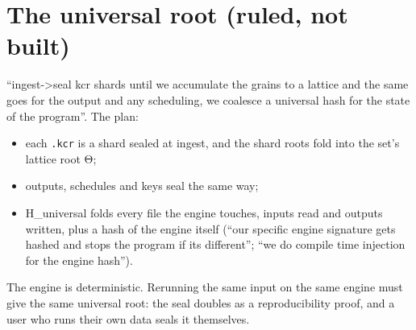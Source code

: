 \section{\texorpdfstring{The universal root (ruled, not built)}{The universal root (ruled, not built)}}

“ingest->seal kcr shards until we accumulate the grains to a lattice and the same goes for the output and any scheduling, we coalesce a universal hash for the state of the program”. The plan:

\begin{itemize}
\item each \texttt{.\allowbreak{}kcr} is a shard sealed at ingest, and the shard roots fold into the set's lattice root Θ;
\item outputs, schedules and keys seal the same way;
\item H\_\allowbreak{}universal folds every file the engine touches, inputs read and outputs written, plus a hash of the engine itself (“our specific engine signature gets hashed and stops the program if its different”; “we do compile time injection for the engine hash”).
\end{itemize}

The engine is deterministic. Rerunning the same input on the same engine must give the same universal root: the seal doubles as a reproducibility proof, and a user who runs their own data seals it themselves.
